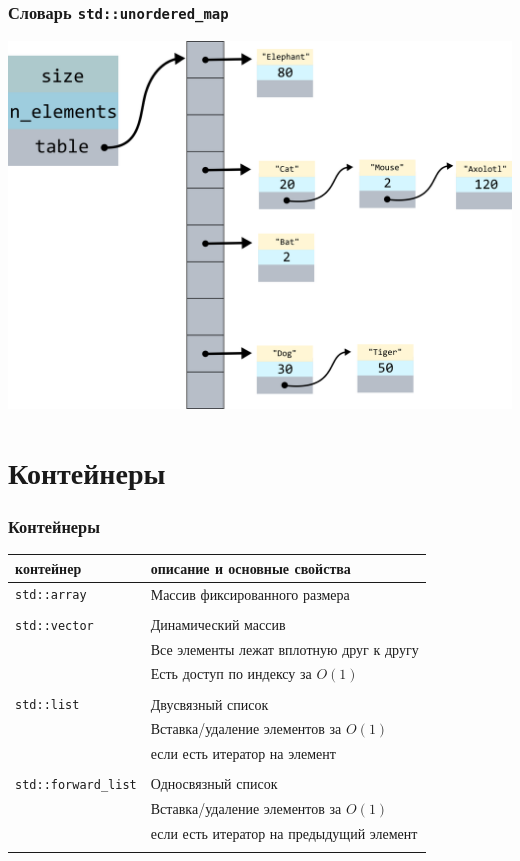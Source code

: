 \documentclass[10pt,pdf,hyperref={unicode}]{beamer}
\begin{document}
\begin{frame}[fragile]
\frametitle{Словарь \texttt{std::unordered\_map}}
\begin{center}
\includegraphics[scale=0.7]{images/hashtable/hashtable_map.png}
\end{center}
\end{frame}

\section{Контейнеры}

\begin{frame}[fragile]
\frametitle{Контейнеры}
\begin{center}
\begin{tabular}{ l | l }
 контейнер & описание и основные свойства \\ \hline
 \texttt{std::array} &  Массив фиксированного размера \\ \\ \hline

 \texttt{std::vector} & Динамический массив \\
                      & Все элементы лежат вплотную друг к другу \\
                      & Есть доступ по индексу за $O(1)$ \\ \\ \hline
 \texttt{std::list} & Двусвязный список \\
                    & Вставка/удаление элементов за $O(1)$ \\ &если есть итератор на элемент \\ \\ \hline
 \texttt{std::forward\_list} & Односвязный список \\
                     & Вставка/удаление элементов за $O(1)$ \\ &если есть итератор на предыдущий элемент\\ \\ \hline
                     
\end{tabular}
\end{center}
\end{frame}
\end{document}
